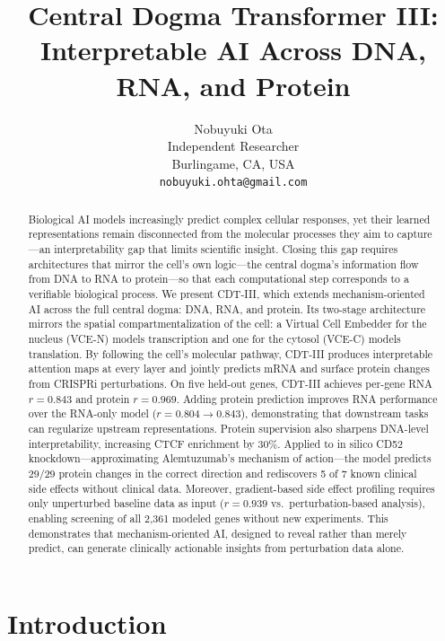 \documentclass{article}
\title{Central Dogma Transformer III:\\
Interpretable AI Across DNA, RNA, and Protein}
\author{
  Nobuyuki Ota \\
  Independent Researcher\\
  Burlingame, CA, USA \\
  \texttt{nobuyuki.ohta@gmail.com}
}
\begin{document}
\maketitle

\begin{abstract}
Biological AI models increasingly predict complex cellular responses, yet their learned representations remain disconnected from the molecular processes they aim to capture---an interpretability gap that limits scientific insight. Closing this gap requires architectures that mirror the cell's own logic---the central dogma's information flow from DNA to RNA to protein---so that each computational step corresponds to a verifiable biological process. We present CDT-III, which extends mechanism-oriented AI across the full central dogma: DNA, RNA, and protein. Its two-stage architecture mirrors the spatial compartmentalization of the cell: a Virtual Cell Embedder for the nucleus (VCE-N) models transcription and one for the cytosol (VCE-C) models translation. By following the cell's molecular pathway, CDT-III produces interpretable attention maps at every layer and jointly predicts mRNA and surface protein changes from CRISPRi perturbations. On five held-out genes, CDT-III achieves per-gene RNA $r = 0.843$ and protein $r = 0.969$. Adding protein prediction improves RNA performance over the RNA-only model ($r = 0.804 \to 0.843$), demonstrating that downstream tasks can regularize upstream representations. Protein supervision also sharpens DNA-level interpretability, increasing CTCF enrichment by 30\%. Applied to in silico CD52 knockdown---approximating Alemtuzumab's mechanism of action---the model predicts 29/29 protein changes in the correct direction and rediscovers 5 of 7 known clinical side effects without clinical data. Moreover, gradient-based side effect profiling requires only unperturbed baseline data as input ($r = 0.939$ vs.\ perturbation-based analysis), enabling screening of all 2,361 modeled genes without new experiments. This demonstrates that mechanism-oriented AI, designed to reveal rather than merely predict, can generate clinically actionable insights from perturbation data alone.
\end{abstract}

\section{Introduction}
\end{document}
